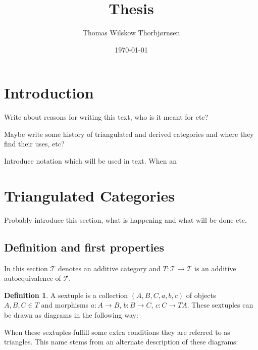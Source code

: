 \documentclass[12pt]{article}
\title{Thesis}
\author{Thomas Wilskow Thorbjørnsen}
\date{\today}
\theoremstyle{definition}
\newtheorem{definition}{Definition}[section]
\theoremstyle{remark}
\begin{document}
    \maketitle
    \section{Introduction}
    
    Write about reasons for writing this text, who is it meant for etc?

    Maybe write some history of triangulated and derived categories and where they find their uses, etc?

    Introduce notation which will be used in text.
    When an 
    \section{Triangulated Categories}
        Probably introduce this section, what is happening and what will be done etc.
        \subsection{Definition and first properties}
        In this section $\mathcal{T}$ denotes an additive category and $T:\mathcal{T}\rightarrow\mathcal{T}$ is an additive autoequivalence of $\mathcal{T}$.
        \begin{definition}
            A sextuple is a collection $(A,B,C,a,b,c)$ of objects \\ $A,B,C\in T$ and morphisms $a:A\rightarrow B$, $b:B\rightarrow C$, $c:C\rightarrow TA$. These sextuples can be drawn as diagrams in the following way:

            \begin{center}
            \end{center}
        \end{definition}

        When these sextuples fulfill some extra conditions they are referred to as triangles. This name stems from an alternate description of these diagrams:

        \begin{center}
        \end{center}
\end{document}
